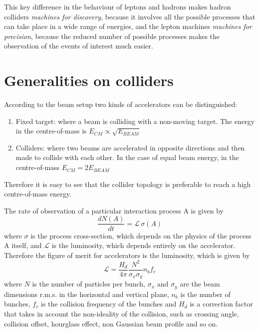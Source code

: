 This key difference in the behaviour of leptons and hadrons makes hadron colliders \textit{machines for discovery}, because it involves all the possible processes that can take place in a wide range of energies, and the lepton machines \textit{machines for precision}, because the reduced number of possible processes makes the observation of the events of interest much easier.

\section{Generalities on colliders}

According to the beam setup two kinds of accelerators can be distinguished: 
\begin{enumerate}
\item Fixed target: where a beam is colliding with a non-moving target. The energy in the centre-of-mass is $E_{CM} \propto \sqrt{E_{BEAM}}$
\item Colliders: where two beams are accelerated in opposite directions and then made to collide with each other. In the case of equal beam energy, in the centre-of-mass $E_{CM} = 2 E_{BEAM}$
\end{enumerate}
Therefore it is easy to see that the collider topology is preferable to reach a high centre-of-mass energy.

The rate of observation of a particular interaction process A is given by
\begin{equation}
\frac{dN(A)}{dt} = \mathscr{L} \, \sigma(A)
\end{equation}
where $\sigma$ is the process cross-section, which depends on the physics of the process A itself, and $\mathscr{L}$ is the luminosity, which depends entirely on the accelerator.
Therefore the figure of merit for accelerators is the luminosity, which is given by
\begin{equation}
\mathscr{L} = \frac{H_d}{4\pi} \frac{N^2}{\sigma_x \sigma_y} n_b f_r
\end{equation}
where $N$ is the number of particles per bunch, $\sigma_x$ and $\sigma_y$ are the beam dimensions r.m.s. in the horizontal and vertical plane, $n_b$ is the number of bunches, $f_r$ is the collision frequency of the bunches and $H_d$ is a correction factor that takes in account the non-ideality of the collision, such as crossing angle, collision offset, hourglass effect, non Gaussian beam profile and so on.

